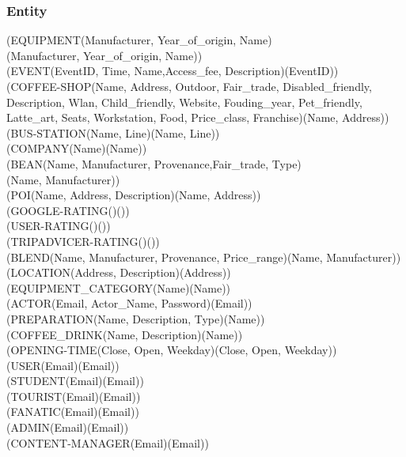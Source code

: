 \subsubsection{Entity}
(EQUIPMENT(Manufacturer, Year\_of\_origin, Name)\\(Manufacturer, Year\_of\_origin, Name))\\
(EVENT(EventID, Time, Name,Access\_fee, Description)(EventID))\\
(COFFEE-SHOP(Name, Address, Outdoor, Fair\_trade, Disabled\_friendly, Description, Wlan, Child\_friendly, Website, Fouding\_year, Pet\_friendly, Latte\_art, Seats, Workstation, Food, Price\_class, Franchise)(Name, Address))\\
(BUS-STATION(Name, Line)(Name, Line))\\
(COMPANY(Name)(Name))\\
(BEAN(Name, Manufacturer, Provenance,Fair\_trade, Type)\\(Name, Manufacturer))\\
(POI(Name, Address, Description)(Name, Address))\\
(GOOGLE-RATING()())\\
(USER-RATING()())\\
(TRIPADVICER-RATING()())\\
(BLEND(Name, Manufacturer, Provenance, Price\_range)(Name, Manufacturer))\\
(LOCATION(Address, Description)(Address))\\
(EQUIPMENT\_CATEGORY(Name)(Name))\\
(ACTOR(Email, Actor\_Name, Password)(Email))\\
(PREPARATION(Name, Description, Type)(Name))\\
(COFFEE\_DRINK(Name, Description)(Name))\\
(OPENING-TIME(Close, Open, Weekday)(Close, Open, Weekday))\\
(USER(Email)(Email))\\
(STUDENT(Email)(Email))\\
(TOURIST(Email)(Email))\\
(FANATIC(Email)(Email))\\
(ADMIN(Email)(Email))\\
(CONTENT-MANAGER(Email)(Email))\\
